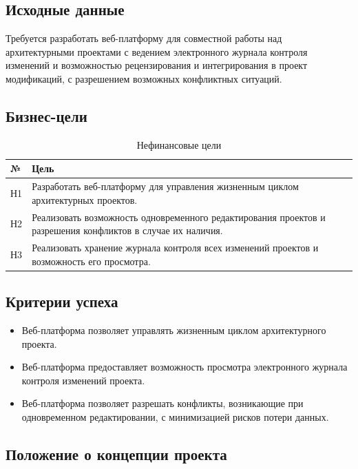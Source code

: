\documentclass[a4paper,14pt]{extreport} %
\begin{document}
\subsection{Исходные данные}

Требуется разработать веб-платформу для совместной работы над архитектурными проектами с ведением электронного журнала контроля изменений и возможностью рецензирования и интегрирования в проект модификаций, с разрешением возможных конфликтных ситуаций.

\newpage
\subsection{Бизнес-цели}

\begin{table}[H]
\caption {Нефинансовые цели} \label{tab:title}
\begin{center}
\begin{tabular}{ | l | p{14cm} | }
\hline
№ & Цель \\
\hline
Н1 & Разработать веб-платформу для управления жизненным циклом	архитектурных проектов. \\
\hline
Н2 & Реализовать возможность одновременного редактирования проектов и разрешения конфликтов в случае их наличия. \\
\hline
Н3 & Реализовать хранение журнала контроля всех изменений проектов и возможность его просмотра. \\
\hline
\end{tabular}
\end{center}
\end{table}
 
\subsection{Критерии успеха}

\begin{itemize}
\item Веб-платформа позволяет управлять жизненным циклом архитектурного проекта.
\item Веб-платформа предоставляет возможность просмотра электронного журнала контроля изменений проекта.
\item Веб-платформа позволяет разрешать конфликты, возникающие при одновременном редактировании, с минимизацией рисков потери данных.
\end {itemize}
 
 \subsection{Положение о концепции проекта}
 
\end{document}
